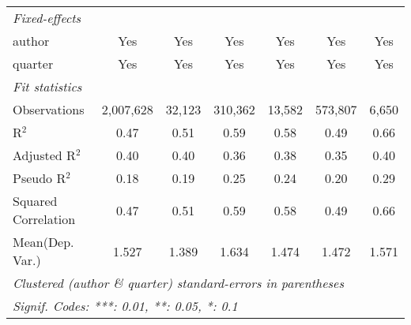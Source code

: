 \begin{tabular}{lcccccc}
   \midrule
   \emph{Fixed-effects}\\
   author                                                     & Yes            & Yes           & Yes           & Yes           & Yes            & Yes\\  
   quarter                                                    & Yes            & Yes           & Yes           & Yes           & Yes            & Yes\\  
   \midrule
   \emph{Fit statistics}\\
   Observations                                               & 2,007,628      & 32,123        & 310,362       & 13,582        & 573,807        & 6,650\\  
   R$^2$                                                      & 0.47           & 0.51          & 0.59          & 0.58          & 0.49           & 0.66\\  
   Adjusted R$^2$                                             & 0.40           & 0.40          & 0.36          & 0.38          & 0.35           & 0.40\\  
   Pseudo R$^2$                                               & 0.18           & 0.19          & 0.25          & 0.24          & 0.20           & 0.29\\  
   Squared Correlation                                        & 0.47           & 0.51          & 0.59          & 0.58          & 0.49           & 0.66\\  
Mean(Dep. Var.) & 1.527 & 1.389 & 1.634 & 1.474 & 1.472 & 1.571 \\
   \midrule \midrule
   \multicolumn{7}{l}{\emph{Clustered (author \& quarter) standard-errors in parentheses}}\\
   \multicolumn{7}{l}{\emph{Signif. Codes: ***: 0.01, **: 0.05, *: 0.1}}\\
\end{tabular}
\par\endgroup
